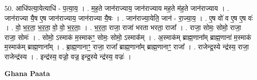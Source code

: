 \documentclass[17pt]{extarticle}
\begin{document}
50. आधि॑पत्या॒येत्याधि॑ - प॒त्या॒य॒ । . म॒ह॒ते जान॑राज्याय॒ जान॑राज्याय मह॒ते म॑ह॒ते जान॑राज्याय । . जान॑राज्या यै॒ष ए॒ष जान॑राज्याय॒ जान॑राज्या यै॒षः । . जान॑राज्या॒येति॒ जान॑ - रा॒ज्या॒य॒ । . ए॒ष वो॑ व ए॒ष ए॒ष वः॑ । . वो॒ भ॒र॒ता॒ भ॒र॒ता॒ वो॒ वो॒ भ॒र॒ताः॒ । . भ॒र॒ता॒ राजा॒ राजा॑ भरता भरता॒ राजा᳚ । . राजा॒ सोमः॒ सोमो॒ राजा॒ राजा॒ सोमः॑ । . सोमो॒ ऽस्माक॑ म॒स्माकꣳ॒॒ सोमः॒ सोमो॒ ऽस्माक᳚म् । . अ॒स्माक॑म् ब्राह्म॒णाना᳚म् ब्राह्म॒णाना॑ म॒स्माक॑ म॒स्माक॑म् ब्राह्म॒णाना᳚म् । . ब्रा॒ह्म॒णानाꣳ॒॒ राजा॒ राजा᳚ ब्राह्म॒णाना᳚म् ब्राह्म॒णानाꣳ॒॒ राजा᳚ । . राजेन्द्र॒स्ये न्द्र॑स्य॒ राजा॒ राजेन्द्र॑स्य । . इन्द्र॑स्य॒ वज्रो॒ वज्र॒ इन्द्र॒स्ये न्द्र॑स्य॒ वज्रः॑ । \newline

\textbf{Ghana Paata } \newline
\end{document}
